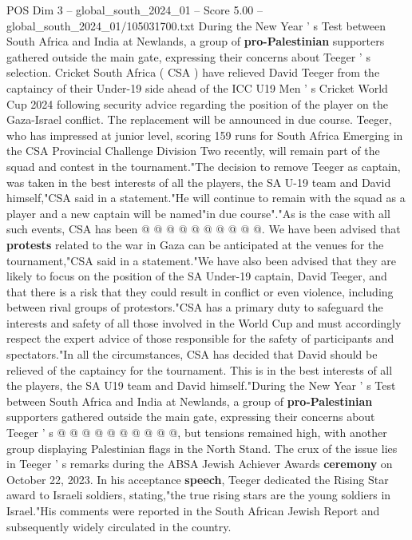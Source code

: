 \begin{textsample}{POS Dim 3 – global\_south\_2024\_01 – Score 5.00 – global\_south\_2024\_01/105031700.txt}  \label{ex:f3_pos_386}
During the New Year ' s Test between South Africa and India at Newlands, a group of \textbf{pro-Palestinian} supporters gathered outside the main gate, expressing their concerns about Teeger ' s selection.
Cricket South Africa ( CSA ) have relieved David Teeger from the captaincy of their Under-19 side ahead of the ICC U19 Men ' s Cricket World Cup 2024 following security advice regarding the position of the player on the Gaza-Israel conflict.
The replacement will be announced in due course.
Teeger, who has impressed at junior level, scoring 159 runs for South Africa Emerging in the CSA Provincial Challenge Division Two recently, will remain part of the squad and contest in the tournament."The decision to remove Teeger as captain, was taken in the best interests of all the players, the SA U-19 team and David himself,"CSA said in a statement."He will continue to remain with the squad as a player and a new captain will be named"in due course"."As is the case with all such events, CSA has been @ @ @ @ @ @ @ @ @ @.
We have been advised that \textbf{protests} related to the war in Gaza can be anticipated at the venues for the tournament,"CSA said in a statement."We have also been advised that they are likely to focus on the position of the SA Under-19 captain, David Teeger, and that there is a risk that they could result in conflict or even violence, including between rival groups of protestors."CSA has a primary duty to safeguard the interests and safety of all those involved in the World Cup and must accordingly respect the expert advice of those responsible for the safety of participants and spectators."In all the circumstances, CSA has decided that David should be relieved of the captaincy for the tournament.
This is in the best interests of all the players, the SA U19 team and David himself."During the New Year ' s Test between South Africa and India at Newlands, a group of \textbf{pro-Palestinian} supporters gathered outside the main gate, expressing their concerns about Teeger ' s @ @ @ @ @ @ @ @ @ @, but tensions remained high, with another group displaying Palestinian flags in the North Stand.
The crux of the issue lies in Teeger ' s remarks during the ABSA Jewish Achiever Awards \textbf{ceremony} on October 22, 2023.
In his acceptance \textbf{speech}, Teeger dedicated the Rising Star award to Israeli soldiers, stating,"the true rising stars are the young soldiers in Israel."His comments were reported in the South African Jewish Report and subsequently widely circulated in the country.

\end{textsample}
